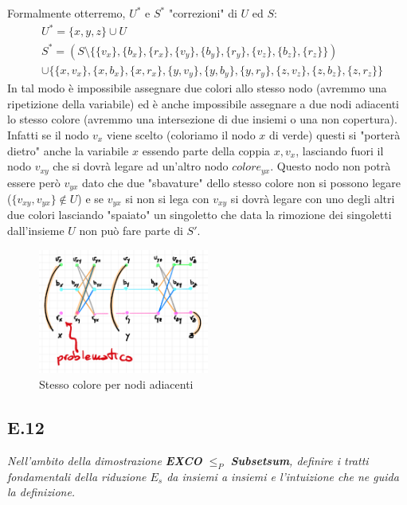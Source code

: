 \documentclass[a4paper]{article}
\begin{document}
Formalmente otterremo, $U^*$ e $S^*$ "correzioni" di $U$ ed $S$:
\begin{align*}
&	U^* = \{x, y, z\} \cup U \\
& 	S^* = (S \setminus \{\{v_x\}, \{b_x\}, \{r_x\}, \{v_y\}, \{b_y\}, \{r_y\}, \{v_z\}, \{b_z\}, \{r_z\}\}) \\
&	\cup \{\{x, v_x\}, \{x, b_x\}, \{x, r_x\}, \{y, v_y\}, \{y, b_y\}, \{y, r_y\}, \{z, v_z\}, \{z, b_z\}, \{z, r_z\}\}
\end{align*}
In tal modo è impossibile assegnare due colori allo stesso nodo (avremmo una ripetizione della variabile) ed è anche impossibile assegnare a due nodi adiacenti lo stesso colore (avremmo una intersezione di due insiemi o una non copertura).
Infatti se il nodo $v_x$ viene scelto (coloriamo il nodo $x$ di verde) questi si "porterà dietro" anche la variabile $x$ essendo parte della coppia ${x,v_x}$, lasciando fuori il nodo $v_{xy}$ che si dovrà legare ad un'altro nodo $colore_{yx}$.
Questo nodo non potrà essere però $v_{yx}$ dato che due "sbavature" dello stesso colore non si possono legare ($\{v_{xy}, v_{yx}\} \not\in U$) e se $v_{yx}$ si non si lega con $v_{xy}$ si dovrà legare con uno degli altri due colori lasciando "spaiato" un singoletto che data la rimozione dei singoletti dall'insieme $U$ non può fare parte di $S'$.
\newpage
\begin{figure}[!ht]
                \centering
                \includegraphics[width = 0.5\textwidth]{./img/E11_sameCol.png}
                \caption{Stesso colore per nodi adiacenti} \label{FIG:E11_sameCol}
\end{figure}

\subsection{E.12}
\emph{Nell’ambito della dimostrazione \textbf{EXCO} $\leq_P$ \textbf{Subsetsum}, definire i tratti fondamentali della riduzione $E_s$ da insiemi a insiemi e l’intuizione che ne guida la definizione.}
\end{document}
